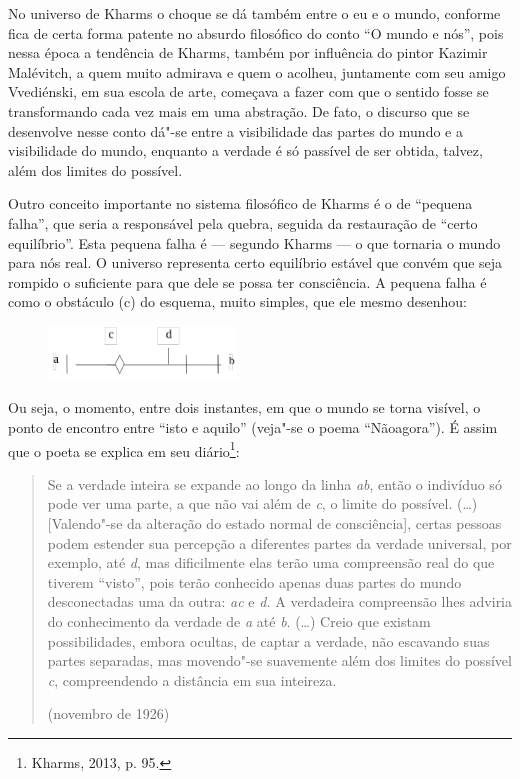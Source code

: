 No universo de Kharms o choque se dá também entre o eu e o mundo,
conforme fica de certa forma patente no absurdo filosófico do conto ``O
mundo e nós'', pois nessa época a tendência de Kharms, também por
influência do pintor Kazimir Malévitch, a quem muito admirava e quem o
acolheu, juntamente com seu amigo Vvediénski, em sua escola de arte,
começava a fazer com que o sentido fosse se transformando cada vez mais
em uma abstração. De fato, o discurso que se desenvolve nesse conto
dá"-se entre a visibilidade das partes do mundo e a visibilidade do
mundo, enquanto a verdade é só passível de ser obtida, talvez, além dos
limites do possível.

Outro conceito importante no sistema filosófico de Kharms é o de
``pequena falha'', que seria a responsável pela quebra, seguida da
restauração de ``certo equilíbrio''. Esta pequena falha é --- segundo
Kharms --- o que tornaria o mundo para nós real. O universo representa
certo equilíbrio estável que convém que seja rompido o suficiente para
que dele se possa ter consciência. A pequena falha é como o obstáculo
(c) do esquema, muito simples, que ele mesmo desenhou:

\begin{figure}[!ht]
\centering
  \includegraphics[width=50mm]{./imgs/fig6.jpg}
\end{figure}

Ou seja, o momento, entre dois instantes, em que o mundo se torna
visível, o ponto de encontro entre ``isto e aquilo'' (veja"-se o poema
``Nãoagora''). É assim que o poeta se explica em seu diário\footnote{Kharms, 2013, p. 95.}:

\begin{quote}
Se a verdade inteira se expande ao longo da linha \emph{ab}, então o
indivíduo só pode ver uma parte, a que não vai além de \emph{c}, o
limite do possível. (\ldots{}) {[}Valendo"-se da alteração do estado
normal de consciência{]}, certas pessoas podem estender sua percepção a
diferentes partes da verdade universal, por exemplo, até \emph{d}, mas
dificilmente elas terão uma compreensão real do que tiverem ``visto'',
pois terão conhecido apenas duas partes do mundo desconectadas uma da
outra: \emph{ac} e \emph{d.} A verdadeira compreensão lhes adviria do
conhecimento da verdade de \emph{a} até \emph{b}. (\ldots{}) Creio que
existam possibilidades, embora ocultas, de captar a verdade, não
escavando suas partes separadas, mas movendo"-se suavemente além dos
limites do possível \emph{c}, compreendendo a distância em sua
inteireza.


\noindent{}(novembro de 1926)
\end{quote}

